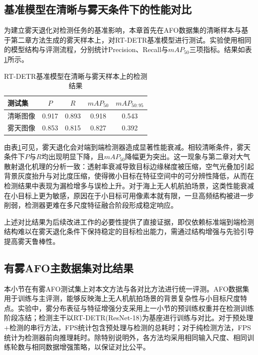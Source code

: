 \subsection{基准模型在清晰与雾天条件下的性能对比}

为建立雾天退化对检测任务的基准影响，本章首先在AFO数据集的清晰样本与基于第二章方法生成的雾天样本上，对RT-DETR基准模型进行测试。实验使用相同的模型结构与评测流程，分别统计Precision、Recall与$mAP_{50}$三项指标。结果如表\ref{tab:rtdetr_clear_fog}所示。

\begin{table}[!htbp]
\centering
\caption{RT-DETR基准模型在清晰与雾天样本上的检测结果}
\label{tab:rtdetr_clear_fog}
\begin{tabular}{lcccc}
\hline
测试集 & $P$ & $R$ & $mAP_{50}$ & $mAP_{50:95}$ \\
\hline
清晰图像 & 0.917 & 0.893 & 0.918 & 0.543 \\
雾天图像 & 0.853 & 0.815 & 0.827 & 0.392 \\
\hline
\end{tabular}
\end{table}

由表\ref{tab:rtdetr_clear_fog}可见，雾天退化会对端到端检测器造成显著性能衰减。相较清晰条件，雾天条件下$P$与$R$均出现明显下降，且$mAP_{50}$降幅更为突出。这一现象与第二章对大气散射退化机理的分析一致：透射率衰减导致目标边缘梯度被压缩，空气光叠加引起背景灰度抬升与对比度压缩，使得微小目标在特征空间中的可分辨性降低，从而在检测结果中表现为漏检增多与误检上升。对于海上无人机航拍场景，这类性能衰减在小目标上更为敏感，原因在于小目标可用像素本就有限，一旦高频结构被进一步削弱，检测器更难在多尺度特征融合阶段形成稳定响应。

上述对比结果为后续改进工作的必要性提供了直接证据，即仅依赖标准端到端检测结构难以在雾天退化条件下保持稳定的目标检出能力，需通过结构增强与先验引导提高雾天鲁棒性。

\subsection{有雾AFO主数据集对比结果}
\label{subsec:afo_cmp}

本小节在有雾AFO测试集上对本文方法与各对比方法进行统一评测。AFO数据集用于训练与主评测，能够反映海上无人机航拍场景的背景复杂性与小目标尺度特点。实验中，雾分布表征与特征增强分支采用上一小节的预训练权重并在检测训练阶段冻结；检测主干以RT-DETR(ResNet-18)为基座进行训练与对比。对于预处理+检测的串行方法，FPS统计包含预处理与检测的总耗时；对于纯检测方法，FPS统计为检测器前向推理耗时。除特别说明外，各方法均采用相同输入尺度、相同训练轮数与相同数据增强策略，以保证对比公平。

